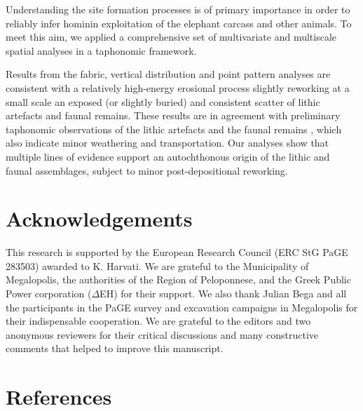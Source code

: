 \documentclass[preprint,authoryear,times]{elsarticle} %
\begin{document}
Understanding the site formation processes is of primary importance in order to reliably infer hominin exploitation of the elephant carcass and other animals. To meet this aim, we applied a comprehensive set of multivariate and multiscale spatial analyses in a taphonomic framework.

Results from the fabric, vertical distribution and point pattern analyses are consistent with a relatively high-energy erosional process slightly reworking at a small scale an exposed (or slightly buried) and consistent scatter of lithic artefacts and faunal remains. These results are in agreement with preliminary taphonomic observations of the lithic artefacts \citep{Tourloukis} and the faunal remains \citep{Konidaris}, which also indicate minor weathering and transportation. Our analyses show that multiple lines of evidence support an autochthonous origin of the lithic and faunal assemblages, subject to minor post-depositional reworking.

\section*{Acknowledgements}

This research is supported by the European Research Council (ERC StG PaGE 283503) awarded to K. Harvati. We are grateful to the Municipality of Megalopolis, the authorities of the Region of Peloponnese, and the Greek Public Power corporation ($\Delta$EH) for their support. We also thank Julian Bega and all the participants in the PaGE survey and excavation campaigns in Megalopolis for their indispensable cooperation. We are grateful to the editors and two anonymous reviewers for their critical discussions and many constructive comments that helped to improve this manuscript.
 
\section*{References}



\end{document}
